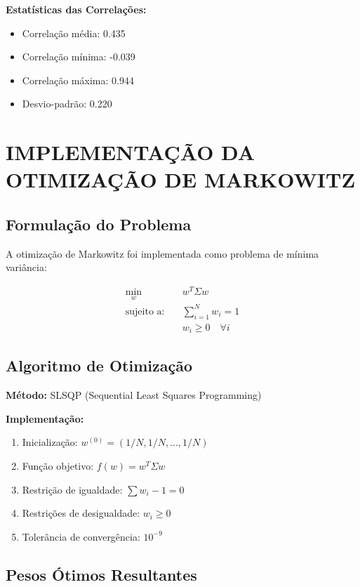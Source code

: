 \textbf{Estatísticas das Correlações:}
\begin{itemize}
    \item Correlação média: 0.435
    \item Correlação mínima: -0.039
    \item Correlação máxima: 0.944
    \item Desvio-padrão: 0.220
\end{itemize}

\section{IMPLEMENTAÇÃO DA OTIMIZAÇÃO DE MARKOWITZ}

\subsection{Formulação do Problema}

A otimização de Markowitz foi implementada como problema de mínima variância:

\begin{align}
\min_{w} \quad & w^T \Sigma w \\
\text{sujeito a:} \quad & \sum_{i=1}^{N} w_i = 1 \\
& w_i \geq 0 \quad \forall i
\end{align}

\subsection{Algoritmo de Otimização}

\textbf{Método:} SLSQP (Sequential Least Squares Programming)

\textbf{Implementação:}
\begin{enumerate}
    \item Inicialização: $w^{(0)} = (1/N, 1/N, ..., 1/N)$
    \item Função objetivo: $f(w) = w^T \Sigma w$
    \item Restrição de igualdade: $\sum w_i - 1 = 0$
    \item Restrições de desigualdade: $w_i \geq 0$
    \item Tolerância de convergência: $10^{-9}$
\end{enumerate}

\subsection{Pesos Ótimos Resultantes}

